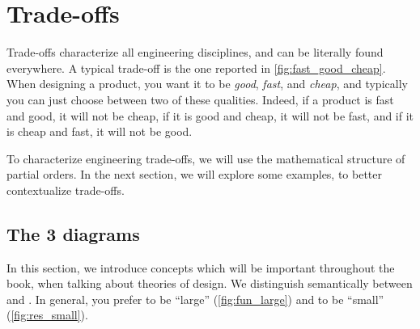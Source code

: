 
\section{Trade-offs}

\begin{marginfigure}
    \centering
    \caption{}
    \label{fig:fast_good_cheap}
\end{marginfigure}

Trade-offs characterize all engineering disciplines, and can be literally found everywhere.
A typical trade-off is the one reported in \cref{fig:fast_good_cheap}.
When designing a product, you want it to be \emph{good}, \emph{fast}, and \emph{cheap}, and typically you can just choose between two of these qualities.
Indeed, if a product is fast and good, it will not be cheap, if it is good and cheap, it will not be fast, and if it is cheap and fast, it will not be good.

To characterize engineering trade-offs, we will use the mathematical structure of partial orders.
In the next section, we will explore some examples, to better contextualize trade-offs.

\subsection{The 3 diagrams}


In this section, we introduce concepts which will be important throughout the book, when talking about theories of design.
We distinguish semantically between  and .
In general, you prefer  to be ``large'' (\cref{fig:fun_large}) and  to be ``small'' (\cref{fig:res_small}).

\begin{figure*}[h]
    \centering
    \hfill
    \hfill
    \hfill
    \caption{}
\end{figure*}

